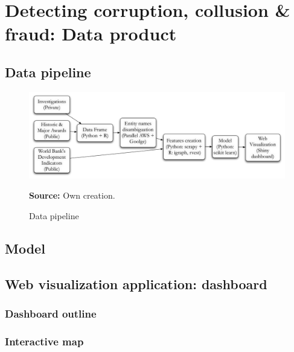 \chapter{Detecting corruption, collusion \& fraud: Data product}\label{chap_prod}

\section{Data pipeline}
\begin{figure}[H]
\begin{center}
\caption{Data pipeline}
\label{fig_pipeline}
\includegraphics[width=\textwidth,height=1\textheight,keepaspectratio]{../img/pipeline.pdf}
\end{center}
\noindent \footnotesize{\textbf{Source:} Own creation.}
\end{figure}

\section{Model}

\section{Web visualization application: dashboard}

\subsection{Dashboard outline}

\subsection{Interactive map}

